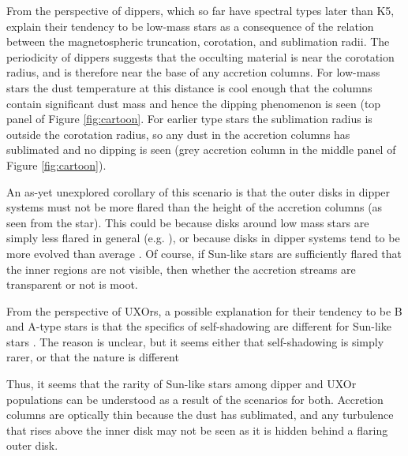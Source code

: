 \documentclass[]{rsos}
\begin{document}
From the perspective of dippers, which so far have spectral types later than K5,
\cite{2016arXiv160503985B} explain their tendency to be low-mass stars as a consequence
of the relation between the magnetospheric truncation, corotation, and sublimation
radii. The periodicity of dippers suggests that the occulting material is near the
corotation radius, and is therefore near the base of any accretion columns. For low-mass
stars the dust temperature at this distance is cool enough that the columns contain
significant dust mass and hence the dipping phenomenon is seen (top panel of Figure
\ref{fig:cartoon}. For earlier type stars the sublimation radius is outside the
corotation radius, so any dust in the accretion columns has sublimated and no dipping is
seen (grey accretion column in the middle panel of Figure \ref{fig:cartoon}).

An as-yet unexplored corollary of this scenario is that the outer disks in dipper systems
must not be more flared than the height of the accretion columns (as seen from the
star). This could be because disks around low mass stars are simply less flared in
general (e.g. \cite{2010ApJ...720.1668S}), or because disks in dipper systems tend to
be more evolved than average \cite{2016ApJ...816...69A}. Of course, if Sun-like stars
are sufficiently flared that the inner regions are not visible, then whether the
accretion streams are transparent or not is moot.

From the perspective of UXOrs, a possible explanation for their tendency to be B and
A-type stars is that the specifics of self-shadowing are different for Sun-like stars
\cite{2003ApJ...594L..47D}. The reason is unclear, but it seems either that
self-shadowing is simply rarer, or that the nature is different \cite[i.e. shadowing by
the inner disk regions, rather than by a puffed-up inner rim,
see]{2004A&A...421.1075D,2007prpl.conf..555D}

Thus, it seems that the rarity of Sun-like stars among dipper and UXOr populations can be
understood as a result of the scenarios for both. Accretion columns are optically thin
because the dust has sublimated, and any turbulence that rises above the inner disk may
not be seen as it is hidden behind a flaring outer disk.
\end{document}
